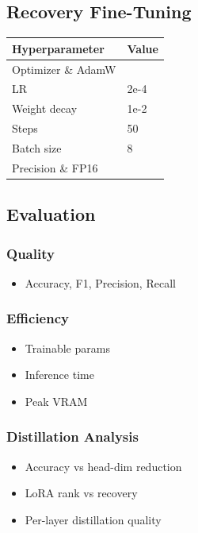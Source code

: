 \subsection{Recovery Fine-Tuning}

\begin{table}[H]
\centering
\small
\begin{tabular}{ll}
\toprule
\textbf{Hyperparameter} & \textbf{Value} \\
\midrule
Optimizer \& AdamW \\
LR & 2e-4 \\
Weight decay & 1e-2 \\
Steps & 50 \\
Batch size & 8 \\
Precision \& FP16 \\
\bottomrule
\end{tabular}
\end{table}

\subsection{Evaluation}

\subsubsection{Quality}
\begin{itemize}
\item Accuracy, F1, Precision, Recall

\end{itemize}
\subsubsection{Efficiency}
\begin{itemize}
\item Trainable params
\item Inference time
\item Peak VRAM

\end{itemize}
\subsubsection{Distillation Analysis}
\begin{itemize}
\item Accuracy vs head-dim reduction
\item LoRA rank vs recovery
\item Per-layer distillation quality

\end{itemize}
